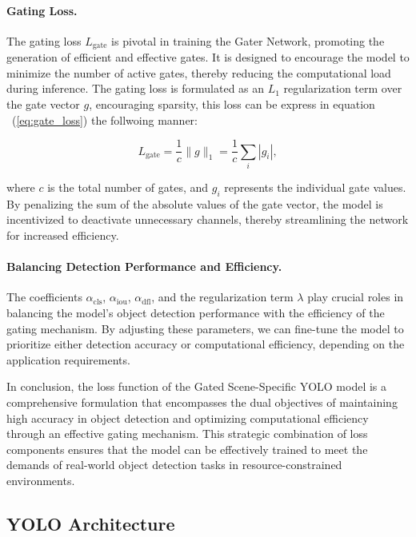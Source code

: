 \paragraph{Gating Loss.} The gating loss \(L_{\text{gate}}\) is pivotal in training the Gater Network, promoting the generation of efficient and effective gates. It is designed to encourage the model to minimize the number of active gates, thereby reducing the computational load during inference. The gating loss is formulated as an \(L_1\) regularization term over the gate vector \(g\), encouraging sparsity, this loss can be express in equation ~(\ref{eq:gate_loss}) the follwoing manner:

\begin{equation}
L_{\text{gate}} = \frac{1}{c} \| g \|_1 = \frac{1}{c} \sum_{i} | g_i |,
\label{eq:gate_loss}
\end{equation}

where \(c\) is the total number of gates, and \(g_i\) represents the individual gate values. By penalizing the sum of the absolute values of the gate vector, the model is incentivized to deactivate unnecessary channels, thereby streamlining the network for increased efficiency.

\paragraph{Balancing Detection Performance and Efficiency.} The coefficients \(\alpha_{\text{cls}}\), \(\alpha_{\text{iou}}\), \(\alpha_{\text{dfl}}\), and the regularization term \(\lambda\) play crucial roles in balancing the model's object detection performance with the efficiency of the gating mechanism. By adjusting these parameters, we can fine-tune the model to prioritize either detection accuracy or computational efficiency, depending on the application requirements.

In conclusion, the loss function of the Gated Scene-Specific YOLO model is a comprehensive formulation that encompasses the dual objectives of maintaining high accuracy in object detection and optimizing computational efficiency through an effective gating mechanism. This strategic combination of loss components ensures that the model can be effectively trained to meet the demands of real-world object detection tasks in resource-constrained environments.

\subsection{YOLO Architecture}

